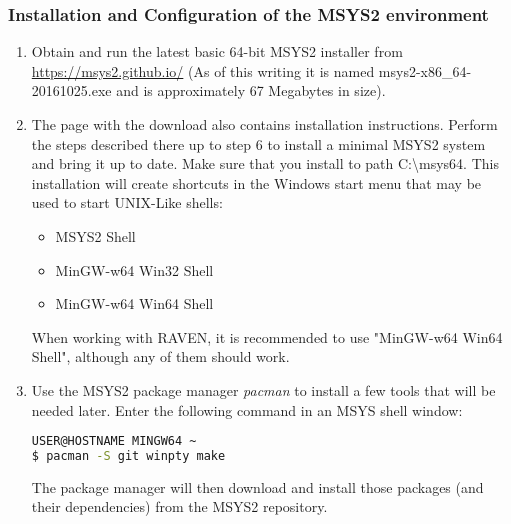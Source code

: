 \subsubsection{Installation and Configuration of the MSYS2 environment}
\begin{enumerate}
    \item Obtain and run the latest basic 64-bit MSYS2 installer from \url{ https://msys2.github.io/} (As of this writing it is named
	msys2-x86\_64-20161025.exe and is approximately 67 Megabytes in size).
    \item The page with the download also contains installation instructions. Perform the steps described there up to
	step 6 to install a minimal MSYS2 system and bring it up to date. Make sure that you install to path
        C:\textbackslash{}msys64.  This installation will create shortcuts in the Windows start menu that may be used
        to start UNIX-Like shells:
		\begin{itemize}
	    		\item MSYS2 Shell
	    		\item MinGW-w64 Win32 Shell
	    		\item MinGW-w64 Win64 Shell
		\end{itemize}
        When working with RAVEN, it is recommended to use "MinGW-w64 Win64 Shell", although any of them should work.
    \item Use the MSYS2 package manager {\it pacman} to install a few tools that will be needed later.  Enter the following command in an MSYS shell window:

\begin{lstlisting}[language=bash]
USER@HOSTNAME MINGW64 ~
$ pacman -S git winpty make
\end{lstlisting}
	The package manager will then download and install those packages (and their dependencies) from the MSYS2
	repository.
\end{enumerate}

